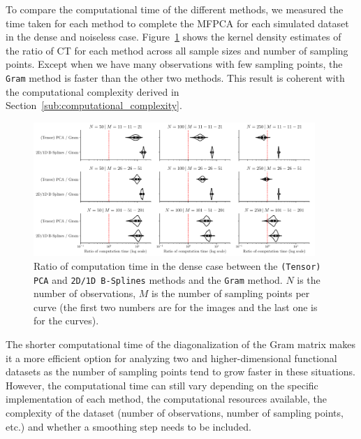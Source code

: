 \begin{results}
To compare the computational time of the different methods, we measured the time taken for each method to complete the MFPCA for each simulated dataset in the dense and noiseless case. Figure~\ref{fig:computation_time_mfd_1d} shows the kernel density estimates of the ratio of CT for each method across all sample sizes and number of sampling points. Except when we have many observations with few sampling points, the \texttt{Gram} method is faster than the other two methods. This result is coherent with the computational complexity derived in Section~\ref{sub:computational_complexity}.

\begin{figure}
     \centering
    \includegraphics[width=0.95\textwidth]{figures/computation_time}
    \caption{Ratio of computation time in the dense case between the \texttt{(Tensor) PCA} and \texttt{2D/1D B-Splines} methods and the \texttt{Gram} method. $N$ is the number of observations, $M$ is the number of sampling points per curve (the first two numbers are for the images and the last one is for the curves).}
    \label{fig:computation_time_mfd_1d}
\end{figure}

The shorter computational time of the diagonalization of the Gram matrix makes it a more efficient option for analyzing two and higher-dimensional functional datasets as the number of sampling points tend to grow faster in these situations. However, the computational time can still vary depending on the specific implementation of each method, the computational resources available, the complexity of the dataset (number of observations, number of sampling points, etc.) and whether a smoothing step needs to be included.
\end{results}

